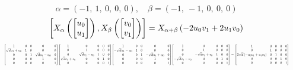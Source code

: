 \documentclass[11pt]{article}
\theoremstyle{definition}
\begin{document}
\[
\alpha = \left( -1, \  1, \  0, \  0, \  0\right), \quad \beta = \left( -1, \  -1, \  0, \  0, \  0\right)
\]
\[
\scaletoalign{\textwidth}{\left[ X_{\alpha}\left(\left[\begin{matrix}u_{0}\\u_{1}\end{matrix}\right]\right), X_{\beta}\left(\left[\begin{matrix}v_{0}\\v_{1}\end{matrix}\right]\right) \right] = X_{\alpha + \beta}\left(- 2 u_{0} v_{1} + 2 u_{1} v_{0}\right)}
\]
\[
\scaletoalign{\textwidth}{{\left[\begin{matrix}1 & 0 & 0 & 0 & 0\\\sqrt{d} u_{1} + u_{0} & 1 & 0 & 0 & 0\\0 & 0 & 1 & \sqrt{d} u_{1} - u_{0} & 0\\0 & 0 & 0 & 1 & 0\\0 & 0 & 0 & 0 & 1\end{matrix}\right]} {\left[\begin{matrix}1 & 0 & 0 & 0 & 0\\0 & 1 & 0 & 0 & 0\\0 & \sqrt{d} v_{1} - v_{0} & 1 & 0 & 0\\\sqrt{d} v_{1} + v_{0} & 0 & 0 & 1 & 0\\0 & 0 & 0 & 0 & 1\end{matrix}\right]} {\left[\begin{matrix}1 & 0 & 0 & 0 & 0\\- \sqrt{d} u_{1} - u_{0} & 1 & 0 & 0 & 0\\0 & 0 & 1 & - \sqrt{d} u_{1} + u_{0} & 0\\0 & 0 & 0 & 1 & 0\\0 & 0 & 0 & 0 & 1\end{matrix}\right]} {\left[\begin{matrix}1 & 0 & 0 & 0 & 0\\0 & 1 & 0 & 0 & 0\\0 & - \sqrt{d} v_{1} + v_{0} & 1 & 0 & 0\\- \sqrt{d} v_{1} - v_{0} & 0 & 0 & 1 & 0\\0 & 0 & 0 & 0 & 1\end{matrix}\right]} = {\left[\begin{matrix}1 & 0 & 0 & 0 & 0\\0 & 1 & 0 & 0 & 0\\2 \sqrt{d} \left(- u_{0} v_{1} + u_{1} v_{0}\right) & 0 & 1 & 0 & 0\\0 & 0 & 0 & 1 & 0\\0 & 0 & 0 & 0 & 1\end{matrix}\right]}}
\]
\end{document}
